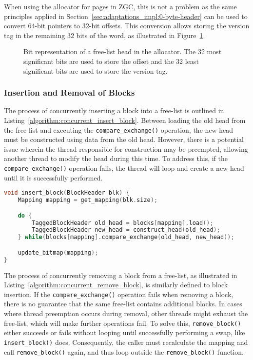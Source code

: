 When using the allocator for pages in ZGC, this is not a problem as the same principles applied in Section~\ref{sec:adaptations_impl:0-byte-header} can be used to convert 64-bit pointers to 32-bit offsets. This conversion allows storing the version tag in the remaining 32 bits of the word, as illustrated in Figure~\ref{fig:concurrent_head_bits}.

\begin{figure}[h]
    \centering
    \vspace*{4mm}
    
    \caption{Bit representation of a free-list head in the allocator. The 32 most significant bits are used to store the offset and the 32 least significant bits are used to store the version tag.}
    \label{fig:concurrent_head_bits}
\end{figure}

\subsubsection{Insertion and Removal of Blocks}

The process of concurrently inserting a block into a free-list is outlined in Listing~\ref{algorithm:concurrent_insert_block}. Between loading the old head from the free-list and executing the \texttt{compare\_exchange()} operation, the new head must be constructed using data from the old head. However, there is a potential issue wherein the thread responsible for construction may be preempted, allowing another thread to modify the head during this time. To address this, if the \texttt{compare\_exchange()} operation fails, the thread will loop and create a new head until it is successfully performed.

\begin{lstlisting}[language=C++, caption={Concurrent insertion of a lock into the head of a free-list.}, label={algorithm:concurrent_insert_block}]
void insert_block(BlockHeader blk) {
    Mapping mapping = get_mapping(blk.size);

    do {
        TaggedBlockHeader old_head = blocks[mapping].load();
        TaggedBlockHeader new_head = construct_head(old_head);
    } while(blocks[mapping].compare_exchange(old_head, new_head));

    update_bitmap(mapping);
}
\end{lstlisting}

The process of concurrently removing a block from a free-list, as illustrated in Listing~\ref{algorithm:concurrent_remove_block}, is similarly defined to block insertion. If the \texttt{compare\_exchange()} operation fails when removing a block, there is no guarantee that the same free-list contains additional blocks. In cases where thread preemption occurs during removal, other threads might exhaust the free-list, which will make further operations fail. To solve this, \texttt{remove\_block()} either succeeds or fails without looping until successfully performing a swap, like \texttt{insert\_block()} does. Consequently, the caller must recalculate the mapping and call \texttt{remove\_block()} again, and thus loop outside the \texttt{remove\_block()} function.


